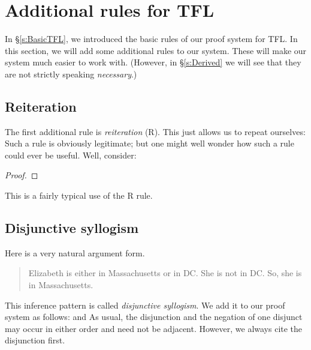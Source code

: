 \chapter{Additional rules for TFL}\label{s:Further}
In \S\ref{s:BasicTFL}, we introduced the basic rules of our proof system for TFL. In this section, we will add some additional rules to our system. These will make our system much easier to work with. (However, in \S\ref{s:Derived} we will see that they are not strictly speaking \emph{necessary}.)

\section{Reiteration}
The first additional rule is \emph{reiteration} (R). This just allows us to repeat ourselves:
Such a rule is obviously legitimate; but one might well wonder how such a rule could ever be useful. Well, consider:
\begin{proof}
	\open
	\close
	\open
	\close
\end{proof}
This is a fairly typical use of the R rule.

\section{Disjunctive syllogism}
Here is a very natural argument form.
	\begin{quote}
		Elizabeth is either in Massachusetts or in DC. She is not in DC. So, she is in Massachusetts.
	\end{quote}
This inference pattern is called \emph{disjunctive syllogism}. We add it to our proof system as follows:
and
As usual, the disjunction and the negation of one disjunct may occur in either order and need not be adjacent. However, we always cite the disjunction first. 

